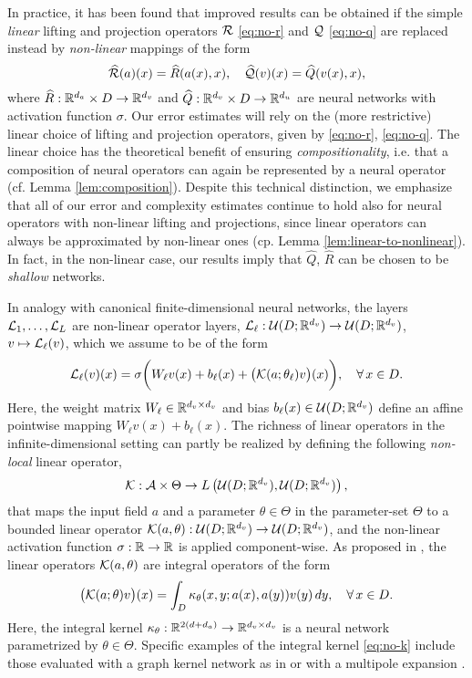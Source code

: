 \documentclass[reqno,a4paper]{amsart}
\begin{document}
\begin{remark}
In practice, it has been found that improved results can be obtained if the simple \emph{linear} lifting and projection operators $\mathcal{R}$ \eqref{eq:no-r} and $\mathcal{Q}$ \eqref{eq:no-q} are replaced instead by \emph{non-linear} mappings of the form 
\[
\widehat{\mathcal{R}}(a)(x) = \widehat{R}(a(x),x), \quad
\widehat{\mathcal{Q}}(v)(x) = \widehat{Q}(v(x),x),
\]
where $\widehat{R}: \mathbb{R}^{d_a}\times D \to \mathbb{R}^{d_v}$ and $\widehat{Q}: \mathbb{R}^{d_v} \times D \to \mathbb{R}^{d_u}$ are neural networks with activation function $\sigma$. Our error estimates will rely on the (more restrictive) linear choice of lifting and projection operators, given by \eqref{eq:no-r}, \eqref{eq:no-q}. The linear choice has the theoretical benefit of ensuring \emph{compositionality}, i.e. that a composition of neural operators can again be represented by a neural operator (cf. Lemma \ref{lem:composition}). Despite this technical distinction, we emphasize that all of our error and complexity estimates continue to hold also for neural operators with non-linear lifting and projections, since linear operators can always be approximated by non-linear ones (cp. Lemma \ref{lem:linear-to-nonlinear}). In fact, in the non-linear case, our results imply that $\hat{Q}$, $\hat{R}$ can be chosen to be \emph{shallow} networks.
\end{remark}



In analogy with canonical finite-dimensional neural networks, the layers $\mathcal{L}_1, \dots, \mathcal{L}_L$ are non-linear operator layers, $\mathcal{L}_\ell: \mathcal{U}(D;\mathbb{R}^{d_v}) \to \mathcal{U}(D;\mathbb{R}^{d_v})$, $v\mapsto \mathcal{L}_\ell(v)$, which we assume to be of the form 
\[
\mathcal{L}_\ell(v)(x)
=
\sigma\bigg(
W_\ell v(x)
+
b_\ell(x)
 + \big(\mathcal{K}(a;\theta_\ell) v\big)(x)
\bigg),
\quad
\forall \, x\in D.
\]
Here, the weight matrix $W_\ell \in \mathbb{R}^{d_v\times d_v}$ and bias $b_\ell(x)\in \mathcal{U}(D;\mathbb{R}^{d_v})$ define an affine pointwise mapping $W_\ell v(x) + b_\ell(x)$. The richness of linear operators in the infinite-dimensional setting can partly be realized by defining the following \emph{non-local} linear operator,  
\[
\mathcal{K}: \mathcal{A}\times \Theta \to L\left(\mathcal{U}(D;\mathbb{R}^{d_v}), \mathcal{U}(D;\mathbb{R}^{d_v})\right),
\]
that maps the input field $a$ and a parameter $\theta \in \Theta$ in the parameter-set $\Theta$ to a bounded linear operator $\mathcal{K}(a,\theta): \mathcal{U}(D;\mathbb{R}^{d_v}) \to \mathcal{U}(D;\mathbb{R}^{d_v})$, and the non-linear activation function $\sigma: \mathbb{R} \to \mathbb{R}$ is applied component-wise. As proposed in \cite{li2020neural}, the linear operators $\mathcal{K}(a,\theta)$ are integral operators of the form 
\begin{align} \label{eq:no-k}
\big(\mathcal{K}(a;\theta) v\big)(x)
=
\int_{D} \kappa_\theta(x,y;a(x),a(y)) v(y) \, dy,
\quad
\forall \, x\in D.
\end{align}
Here, the integral kernel $\kappa_\theta: \mathbb{R}^{2(d+d_a)} \to \mathbb{R}^{d_v\times d_v}$ is a neural network parametrized by $\theta \in \Theta$. Specific examples of the integral kernel \eqref{eq:no-k} include those evaluated with a graph kernel network as in \cite{li2020neural} or with a multipole expansion \cite{li2020multipole}.
\end{document}
